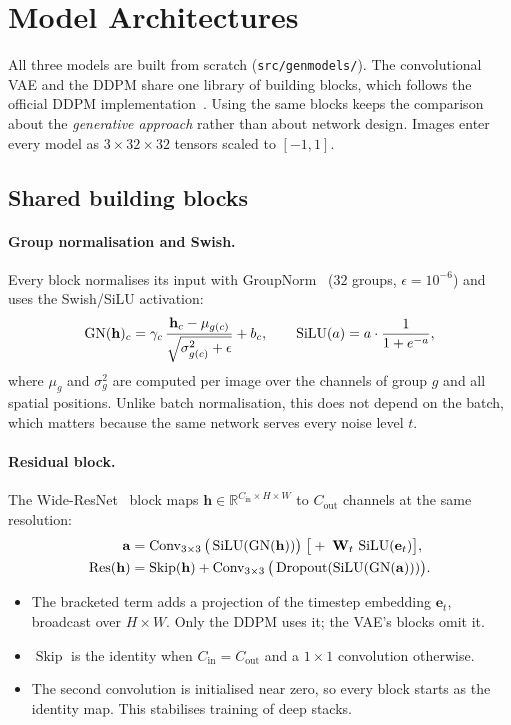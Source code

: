 \section{Model Architectures}
\label{sec:arch}

All three models are built from scratch (\texttt{src/genmodels/}). The convolutional VAE and the DDPM share one
library of building blocks, which follows the official DDPM implementation~\citep{ho2020ddpm}. Using the same
blocks keeps the comparison about the \emph{generative approach} rather than about network design. Images enter
every model as $3\times32\times32$ tensors scaled to $[-1,1]$.

\subsection{Shared building blocks}
\label{sec:blocks}

\paragraph{Group normalisation and Swish.} Every block normalises its input with GroupNorm~\citep{wu2018gn}
($32$ groups, $\epsilon=10^{-6}$) and uses the Swish/SiLU activation:
\begin{equation}
  \operatorname{GN}(\mathbf{h})_{c} = \gamma_c\,\frac{\mathbf{h}_c-\mu_{g(c)}}{\sqrt{\sigma^2_{g(c)}+\epsilon}} + b_c,
  \qquad \operatorname{SiLU}(a) = a\cdot\frac{1}{1+e^{-a}},
\end{equation}
where $\mu_g$ and $\sigma_g^2$ are computed per image over the channels of group $g$ and all spatial positions.
Unlike batch normalisation, this does not depend on the batch, which matters because the same network serves
every noise level $t$.

\paragraph{Residual block.} The Wide-ResNet~\citep{zagoruyko2016wrn,he2016resnet} block maps
$\mathbf{h}\in\mathbb{R}^{C_\text{in}\times H\times W}$ to $C_\text{out}$ channels at the same resolution:
\begin{align}
  \mathbf{a} &= \operatorname{Conv}_{3\times3}\big(\operatorname{SiLU}(\operatorname{GN}(\mathbf{h}))\big) \;\big[+\; \mathbf{W}_t\,\operatorname{SiLU}(\mathbf{e}_t)\big], \label{eq:res1}\\
  \operatorname{Res}(\mathbf{h}) &= \operatorname{Skip}(\mathbf{h}) + \operatorname{Conv}_{3\times3}\big(\operatorname{Dropout}(\operatorname{SiLU}(\operatorname{GN}(\mathbf{a})))\big). \label{eq:res2}
\end{align}
\begin{itemize}
  \item The bracketed term adds a projection of the timestep embedding $\mathbf{e}_t$, broadcast over $H\times W$.
        Only the DDPM uses it; the VAE's blocks omit it.
  \item $\operatorname{Skip}$ is the identity when $C_\text{in}=C_\text{out}$ and a $1\times1$ convolution
        otherwise.
  \item The second convolution is initialised near zero, so every block starts as the identity map. This
        stabilises training of deep stacks.
\end{itemize}

